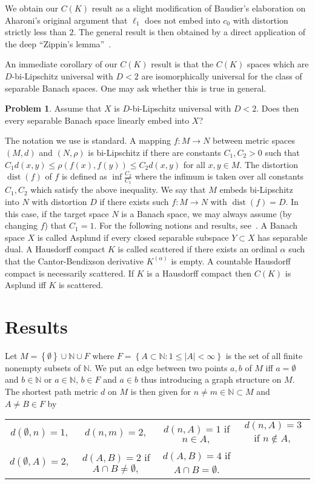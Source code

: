 \documentclass[english,a4paper,12pt]{amsart}
\newcommand{\Natural}{\mathbb N}
\newcommand{\abs}[1]{\left\vert#1\right\vert}
\newcommand{\set}[1]{\left\{#1\right\}}
\newcommand{\cardinality}[1]{\abs{#1}}
\newcommand{\dist}{\mathop{\mathrm{dist}}\nolimits}
\theoremstyle{plain}
\theoremstyle{definition}
\newtheorem{prob}[thm]{Problem}
\begin{document}
We obtain our $C(K)$ result as a slight modification of Baudier's elaboration on  Aharoni's original argument that $\ell_1$ does not embed into $c_0$ with distortion strictly less than $2$.
The general result is then obtained by a direct application of the deep ``Zippin's lemma''~\cite[Theorem~1.2]{Zippin}.

An immediate corollary of our $C(K)$ result is that the $C(K)$ spaces which are $D$-bi-Lipschitz universal with $D<2$ are isomorphically universal for the class of separable Banach spaces. One may ask whether this is true in general.
\begin{prob}
 Assume that $X$ is $D$-bi-Lipschitz universal with $D<2$. Does then every separable Banach space linearly embed into $X$?
\end{prob}



 The notation we use is standard. A mapping $f:M \to N$ between metric spaces $(M,d)$ and $(N,\rho)$ is bi-Lipschitz if there are constants $C_1,C_2>0$ such that
$C_1 d(x,y)\leq \rho(f(x),f(y))\leq C_2 d(x,y)$ for all $x,y \in M$. The distortion $\dist(f)$ of $f$ is defined as $\inf \frac{C_2}{C_1}$ where the infimum is taken over all constants $C_1,C_2$ which satisfy the above inequality. We say that $M$ embeds bi-Lipschitz into $N$ with distortion $D$ if there exists such $f:M\to N$ with $\dist(f)=D$. In this case, if the target space $N$ is a Banach space, we may always assume (by changing $f$) that $C_1=1$.
For the following notions and results, see~\cite{DGZ}. %
A Banach space $X$ is called Asplund if every closed separable subspace $Y \subset X$ has separable dual.
A Hausdorff compact $K$ is called scattered if there exists an ordinal $\alpha$ such that the Cantor-Bendixson derivative $K^{(\alpha)}$ is empty. 
A countable Hausdorff compact is necessarily scattered. 
If $K$ is a Hausdorff compact then $C(K)$ is Asplund iff $K$ is scattered. 

\section{Results}
Let $M=\set{\emptyset} \cup \Natural \cup F$ where $F=\set{A\subset \Natural:1\leq \cardinality{A}<\infty}$ is the set of all finite nonempty subsets of $\Natural$.
We put an edge between two points $a,b$ of $M$ iff
$a=\emptyset$ and $b\in \Natural$ or $a\in \Natural$, $b \in F$ and $a\in b$ thus introducing a graph structure on $M$.
The shortest path metric $d$ on $M$ is then given for $n \neq m \in \Natural\subset M$ and $A\neq B \in F$ by 
\begin{center}
\begin{tabular}{cccc}
 $d(\emptyset,n)=1,$& $d(n,m)=2,$ & $d(n,A)=1$ if $n\in A,$ & $d(n,A)=3$ if $n \notin A,$\\
 $d(\emptyset,A)=2,$& $d(A,B)=2$ if $A\cap B \neq \emptyset,$& $d(A,B)=4$ if $A \cap B =\emptyset$.
\end{tabular}
\end{center}
\end{document}
